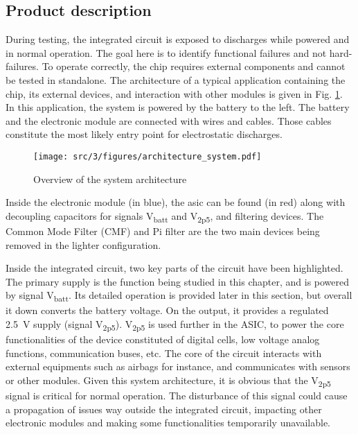 \subsection{Product description}
\label{sec:product-desc}

During testing, the integrated circuit is exposed to discharges while powered and in normal operation.
The goal here is to identify functional failures and not hard-failures.
To operate correctly, the chip requires external components and cannot be tested in standalone.
The architecture of a typical application containing the chip, its external devices, and interaction with other modules is given in Fig. \ref{fig:system_architecture}.
In this application, the system is powered by the battery to the left.
The battery and the electronic module are connected with wires and cables.
Those cables constitute the most likely entry point for electrostatic discharges.

\begin{figure}[!h]
  \centering
  \texttt{[image: src/3/figures/architecture\_system.pdf]}
  \caption{Overview of the system architecture}
  \label{fig:system_architecture}
\end{figure}

Inside the electronic module (in blue), the \gls{asic} can be found (in red) along with decoupling capacitors for signals V\textsubscript{batt} and V\textsubscript{2p5}, and filtering devices.
The Common Mode Filter (CMF) and Pi filter are the two main devices being removed in the lighter configuration.

Inside the integrated circuit, two key parts of the circuit have been highlighted.
The primary supply is the function being studied in this chapter, and is powered by signal V\textsubscript{batt}.
Its detailed operation is provided later in this section, but overall it down converts the battery voltage.
On the output, it provides a regulated \SI{2.5}{\volt} supply (signal V\textsubscript{2p5}).
V\textsubscript{2p5} is used further in the ASIC, to power the core functionalities of the device constituted of digital cells, low voltage analog functions, communication buses, etc.
The core of the circuit interacts with external equipments such as airbags for instance, and communicates with sensors or other modules.
Given this system architecture, it is obvious that the V\textsubscript{2p5} signal is critical for normal operation.
The disturbance of this signal could cause a propagation of issues way outside the integrated circuit, impacting other electronic modules and making some functionalities temporarily unavailable.

